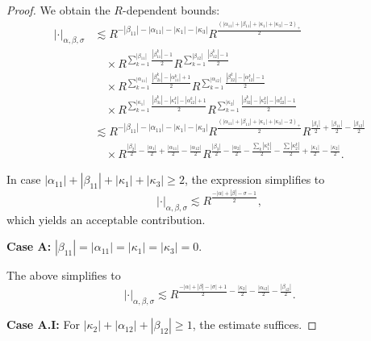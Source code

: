 \documentclass[10pt,a4paper]{amsart}
\begin{document}
\begin{proof}
We obtain the $R$-dependent bounds:
\begin{equation}
\label{eq:PhaseFunctionBound}
\begin{split}
|\cdot|_{\alpha,\beta,\sigma} &\lesssim R^{-|\beta_{11}| - |\alpha_{11}| - |\kappa_1| - |\kappa_3|}  R^{\frac{(|\alpha_{11}| + |\beta_{11}| + |\kappa_1| + |\kappa_3| - 2)_+}{2}} \\
&\quad \times R^{\sum_{k=1}^{|\beta_{11}|} \frac{|\beta_{11}^k| - 1}{2}} R^{\sum_{k=1}^{|\beta_{12}|} \frac{|\beta_{12}^k|-1}{2}} \\
&\quad \times R^{\sum_{k=1}^{|\alpha_{11}|} \frac{|\beta_{21}^k| - |\alpha_{11}^k| + 1}{2}} R^{\sum_{k=1}^{|\alpha_{12}|} \frac{|\beta_{22}^k|- |\alpha_{12}^k| - 1}{2}} \\
&\quad \times R^{\sum_{k=1}^{|\kappa_1|} \frac{|\beta_{31}^k| - |\kappa_1^k| - |\alpha_{12}^k| + 1}{2}} 
 R^{\sum_{k=1}^{|\kappa_2|} \frac{|\beta_{32}^k| - |\kappa_2^k| - |\alpha_{22}^k| - 1}{2}} \\
&\lesssim R^{-|\beta_{11}| - |\alpha_{11}| - |\kappa_1| - |\kappa_3|} R^{\frac{(|\alpha_{11}| + |\beta_{11}| + |\kappa_1| + |\kappa_3| - 2)_+}{2}} R^{\frac{|\beta_1|}{2} + \frac{|\beta_{11}|}{2} - \frac{|\beta_{12}|}{2}}  \\
&\quad \times R^{\frac{|\beta_2|}{2} - \frac{|\alpha_1|}{2} + \frac{|\alpha_{11}|}{2} - \frac{|\alpha_{12}|}{2}} R^{\frac{|\beta_3|}{2}-\frac{|\alpha_2|}{2} - \frac{\sum_k |\kappa_1^k|}{2} - \frac{\sum |\kappa_2^k|}{2} +  \frac{|\kappa_1|}{2}-\frac{|\kappa_2|}{2}}.
\end{split}
\end{equation}

In case $|\alpha_{11}|+|\beta_{11}| + |\kappa_1| + |\kappa_3| \geq 2$, the expression simplifies to
\begin{equation*}
| \cdot |_{\alpha,\beta,\sigma} \lesssim R^{\frac{-|\alpha|+|\beta|-\sigma-1}{2}},
\end{equation*}
which yields an acceptable contribution.

\smallskip

\textbf{Case A:} $|\beta_{11}|=|\alpha_{11}|=|\kappa_1| = |\kappa_3|= 0$.

The above simplifies to
\begin{equation*}
| \cdot |_{\alpha,\beta,\sigma} \lesssim R^{\frac{-|\alpha|+|\beta|-|\sigma|+1}{2} - \frac{|\kappa_2|}{2} - \frac{|\alpha_{12}|}{2} - \frac{|\beta_{12}|}{2}}.
\end{equation*}

\textbf{Case A.I:} For $|\kappa_2| + |\alpha_{12}| + |\beta_{12}| \geq 1$, the estimate suffices.


\end{proof}
\end{document}
